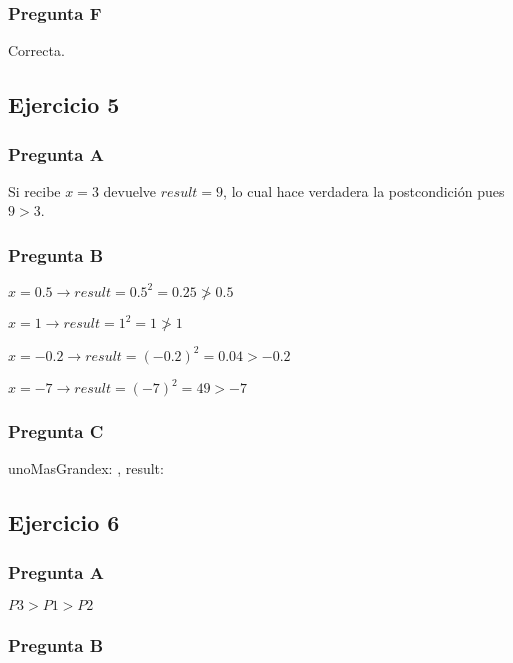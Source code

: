 \subsubsection{Pregunta F}

Correcta.

\subsection{Ejercicio 5}

\subsubsection{Pregunta A}

Si recibe $x = 3$ devuelve $result = 9$, lo cual hace verdadera la postcondición pues $9 > 3$.

\subsubsection{Pregunta B}

$x = 0.5 \rightarrow result = 0.5^2 = 0.25 \ngtr 0.5$

$x = 1 \rightarrow result = 1^2 = 1 \ngtr 1$

$x = -0.2 \rightarrow result = (-0.2)^2 = 0.04 > -0.2$

$x = -7 \rightarrow result = (-7)^2 = 49 > -7$

\subsubsection{Pregunta C}

\begin{proc}{unoMasGrande}{\In x: \float, \Out result: \float}{}
\end{proc}

\subsection{Ejercicio 6}

\subsubsection{Pregunta A}

$P3 > P1 > P2$

\subsubsection{Pregunta B}

